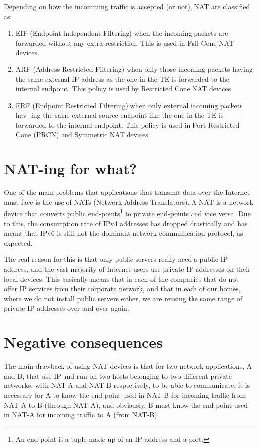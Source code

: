 \begin{enumrate}
Depending on how the incomming traffic is accepted (or not), NAT are
classified as:

\begin{enumerate}
\item EIF (Endpoint Independent Filtering) when the incoming packets
  are forwarded without any extra restriction. This is used in Full
  Cone NAT devices.
\item ARF (Address Restricted Filtering) when only those incoming
  packets having the same external IP address as the one in the TE is
  forwarded to the internal endpoint. This policy is used by
  Restricted Cone NAT devices.
\item ERF (Endpoint Restricted Filtering) when only external incoming
  packets hav- ing the same external source endpoint like the one in
  the TE is forwarded to the internal endpoint. This policy is used in
  Port Restricted Cone (PRCN) and Symmetric NAT devices.
\end{enumerate}
  
\section{NAT-ing for what?}

One of the main problems that applications that transmit data over the
Internet must face is the use of NATs (Network Address Translators). A
NAT is a network device that converts public end-points\footnote{An
end-point is a tuple made up of an IP address and a port.} to private
end-points and vice versa. Due to this, the consumption rate of IPv4
addresses has dropped drastically and has meant that IPv6 is still not
the dominant network communication protocol, as expected.

The real reason for this is that only public servers really need a
public IP address, and the vast majority of Internet users use private
IP addresses on their local devices. This basically means that in each
of the companies that do not offer IP services from their corporate
network, and that in each of our homes, where we do not install public
servers either, we are reusing the same range of private IP addresses
over and over again.

\section{Negative consequences}

The main drawback of using NAT devices is that for two network
applications, A and B, that use IP and run on two hosts belonging to
two different private networks, with NAT-A and NAT-B respectively, to
be able to communicate, it is necessary for A to know the end-point
used in NAT-B for incoming traffic from NAT-A to B (through NAT-A),
and obviously, B must know the end-point used in NAT-A for incoming
traffic to A (from NAT-B).


\end{enumrate}
